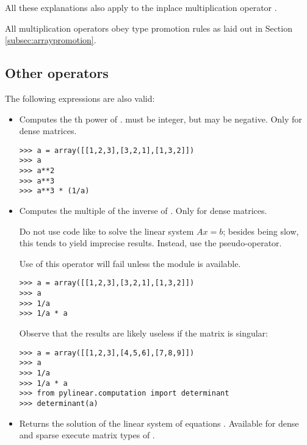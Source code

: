 All these explanations also apply to the inplace multiplication
operator \code{*=}.

All multiplication operators obey type promotion rules as laid out
in Section \ref{subsec:arraypromotion}.

\subsection{Other  operators}

The following expressions are also valid:
\begin{itemize} 
\item {}

  Computes the th power of .  must be
  integer, but may be negative. Only for dense matrices.

\begin{verbatim}
>>> a = array([[1,2,3],[3,2,1],[1,3,2]])
>>> a
>>> a**2
>>> a**3
>>> a**3 * (1/a)
\end{verbatim}
\item {}

  Computes the  multiple of the inverse of
  . Only for dense matrices.

  Do not use code like  to solve the linear system
  $Ax=b$; besides being slow, this tends to yield imprecise
  results. Instead, use the  pseudo-operator.

  Use of this operator will fail unless the module
   is available.

\begin{verbatim}
>>> a = array([[1,2,3],[3,2,1],[1,3,2]])
>>> a
>>> 1/a
>>> 1/a * a
\end{verbatim}

  Observe that the results are likely useless if the matrix
  is singular:

\begin{verbatim}
>>> a = array([[1,2,3],[4,5,6],[7,8,9]])
>>> a
>>> 1/a
>>> 1/a * a
>>> from pylinear.computation import determinant
>>> determinant(a)
\end{verbatim}

\item {}

  Returns the solution of the linear system of equations .
  Available for dense and sparse execute matrix types of .


\end{itemize}
